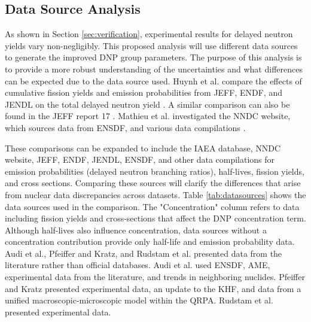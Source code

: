 \subsection{Data Source Analysis}
As shown in Section \ref{sec:verification}, experimental results for delayed neutron yields vary non-negligibly.
This proposed analysis will use different data sources to generate the improved \gls{DNP} group parameters.
The purpose of this analysis is to provide a more robust understanding of the uncertainties and what differences can be expected due to the data source used.
Huynh et al. compare the effects of cumulative fission yields and emission probabilities from \gls{JEFF}, \gls{ENDF}, and \gls{JENDL} on the total delayed neutron yield \cite{huynh2014calculation}.
A similar comparison can also be found in the \gls{JEFF} report 17 \cite{bank2000jef}.
Mathieu et al. investigated the \gls{NNDC} website, which sources data from \gls{ENSDF}, and various data compilations \cite{mathieu2012new, pfeiffer2002status, audi2003nubase, rudstam1993delayed}.

These comparisons can be expanded to include the \gls{IAEA} database, \gls{NNDC} website, \gls{JEFF}, \gls{ENDF}, \gls{JENDL}, \gls{ENSDF}, and other data compilations for emission probabilities (delayed neutron branching ratios), half-lives, fission yields, and cross sections.
Comparing these sources will clarify the differences that arise from nuclear data discrepancies across datasets.
Table \ref{tab:datasources} shows the data sources used in the comparison.
The "Concentration" column refers to data including fission yields and cross-sections that affect the \gls{DNP} concentration term.
Although half-lives also influence concentration, data sources without a concentration contribution provide only half-life and emission probability data.
Audi et al., Pfeiffer and Kratz, and Rudstam et al. presented data from the literature rather than official databases.
Audi et al. used \gls{ENSDF}, \gls{AME}, experimental data from the literature, and trends in neighboring nuclides.
Pfeiffer and Kratz presented experimental data, an update to the \gls{KHF}, and data from a unified macroscopic-microscopic model within the \gls{QRPA}.
Rudstam et al. presented experimental data.

